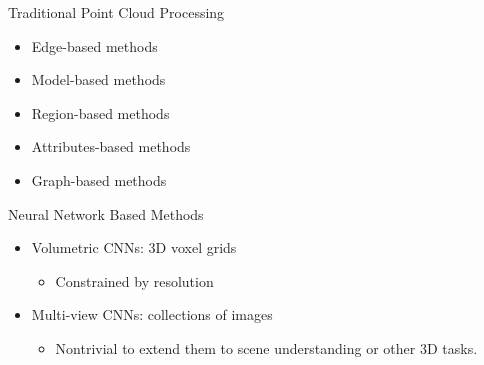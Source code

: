 \documentclass[serif,mathserif]{beamer}
\begin{document}
\begin{frame}{Traditional Point Cloud Processing}
		\begin{itemize}
			\item Edge-based methods
			\item Model-based methods
			\item Region-based methods
			\item Attributes-based methods
			\item Graph-based methods
		\end{itemize}
		\begin{figure}
			\centering
			 
		\end{figure}
	
\end{frame}

\begin{frame}{Neural Network Based Methods}
	\begin{itemize}
		\item Volumetric CNNs: 3D voxel grids
		\begin{itemize}
			\item Constrained by resolution
		\end{itemize}
		\item Multi-view CNNs: collections of images
		\begin{itemize}
			\item Nontrivial to extend them to scene understanding or other 3D tasks.
		\end{itemize}
	\end{itemize}
\end{frame}
\end{document}
